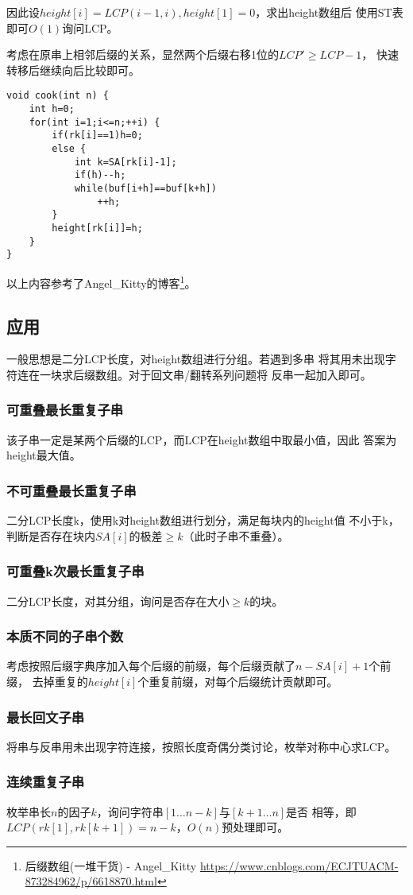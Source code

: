 因此设$height[i]=LCP(i-1,i),height[1]=0$，求出height数组后
使用ST表即可$O(1)$询问LCP。

考虑在原串上相邻后缀的关系，显然两个后缀右移1位的$LCP'\geq LCP-1$，
快速转移后继续向后比较即可。

\begin{lstlisting}
void cook(int n) {
    int h=0;
    for(int i=1;i<=n;++i) {
        if(rk[i]==1)h=0;
        else {
            int k=SA[rk[i]-1];
            if(h)--h;
            while(buf[i+h]==buf[k+h])
                ++h;
        }
        height[rk[i]]=h;
    }
}
\end{lstlisting}
以上内容参考了Angel\_Kitty的博客\footnote{后缀数组(一堆干货) - Angel\_Kitty
    \url{https://www.cnblogs.com/ECJTUACM-873284962/p/6618870.html}
}。
\subsection{应用}
一般思想是二分LCP长度，对height数组进行分组。若遇到多串
将其用未出现字符连在一块求后缀数组。对于回文串/翻转系列问题将
反串一起加入即可。
\subsubsection{可重叠最长重复子串}
该子串一定是某两个后缀的LCP，而LCP在height数组中取最小值，因此
答案为height最大值。
\subsubsection{不可重叠最长重复子串}
二分LCP长度k，使用k对height数组进行划分，满足每块内的height值
不小于k，判断是否存在块内$SA[i]$的极差$\geq k$（此时子串不重叠）。
\subsubsection{可重叠k次最长重复子串}
二分LCP长度，对其分组，询问是否存在大小$\geq k$的块。
\subsubsection{本质不同的子串个数}
考虑按照后缀字典序加入每个后缀的前缀，每个后缀贡献了$n-SA[i]+1$个前缀，
去掉重复的$height[i]$个重复前缀，对每个后缀统计贡献即可。
\subsubsection{最长回文子串}
将串与反串用未出现字符连接，按照长度奇偶分类讨论，枚举对称中心求LCP。
\subsubsection{连续重复子串}
枚举串长$n$的因子$k$，询问字符串$[1\ldots n-k]$与$[k+1\ldots n]$是否
相等，即$LCP(rk[1],rk[k+1])=n-k$，$O(n)$预处理即可。
